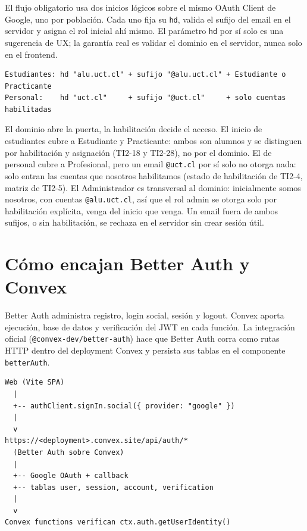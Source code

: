 \documentclass[11pt,a4paper]{article}
\begin{document}
El flujo obligatorio usa dos inicios lógicos sobre el mismo OAuth Client de
Google, uno por población. Cada uno fija su \texttt{hd}, valida el sufijo
del email en el servidor y asigna el rol inicial ahí mismo. El parámetro
\texttt{hd} por sí solo es una sugerencia de UX; la garantía real es validar
el dominio en el servidor, nunca solo en el frontend.

\begin{lstlisting}
Estudiantes: hd "alu.uct.cl" + sufijo "@alu.uct.cl" + Estudiante o Practicante
Personal:    hd "uct.cl"     + sufijo "@uct.cl"     + solo cuentas habilitadas
\end{lstlisting}

El dominio abre la puerta, la habilitación decide el acceso. El inicio de
estudiantes cubre a Estudiante y Practicante: ambos son alumnos y se
distinguen por habilitación y asignación (TI2-18 y TI2-28), no por el
dominio. El de personal cubre a Profesional, pero un email
\texttt{@uct.cl} por sí solo no otorga nada: solo entran las cuentas que
nosotros habilitamos (estado de habilitación de TI2-4, matriz de TI2-5). El
Administrador es transversal al dominio: inicialmente somos nosotros, con
cuentas \texttt{@alu.uct.cl}, así que el rol admin se otorga solo por
habilitación explícita, venga del inicio que venga. Un email fuera de ambos
sufijos, o sin habilitación, se rechaza en el servidor sin crear sesión
útil.

\section{Cómo encajan Better Auth y Convex}

Better Auth administra registro, login social, sesión y logout. Convex aporta
ejecución, base de datos y verificación del JWT en cada función. La
integración oficial (\texttt{@convex-dev/better-auth}) hace que Better Auth
corra como rutas HTTP dentro del deployment Convex y persista sus tablas en
el componente \texttt{betterAuth}.

\begin{lstlisting}
Web (Vite SPA)
  |
  +-- authClient.signIn.social({ provider: "google" })
  |
  v
https://<deployment>.convex.site/api/auth/*
  (Better Auth sobre Convex)
  |
  +-- Google OAuth + callback
  +-- tablas user, session, account, verification
  |
  v
Convex functions verifican ctx.auth.getUserIdentity()
\end{lstlisting}
\end{document}
